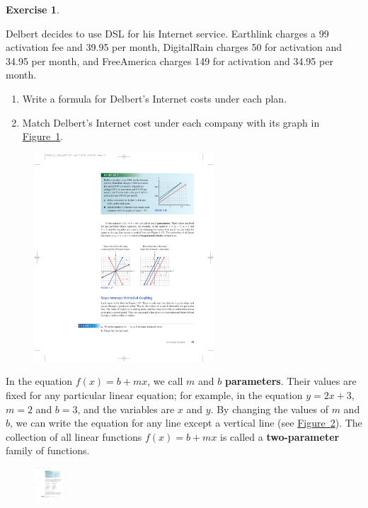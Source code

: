 \documentclass[10pt,]{book}
\newcommand{\terminology}[1]{\textbf{#1}}
\theoremstyle{plain}
\theoremstyle{definition}
\theoremstyle{definition}
\theoremstyle{definition}
\theoremstyle{definition}
\newtheorem{exercise}[theorem]{Exercise}
\numberwithin{equation}{section}
\begin{document}
\begin{exercise}\label{exercise-dsl-price}

Delbert decides to use DSL for his Internet service. Earthlink charges a \textdollar{}99 activation fee and \textdollar{}39.95 per month, DigitalRain charges \textdollar{}50 for activation and \textdollar{}34.95 per month, and FreeAmerica charges \textdollar{}149 for activation and \textdollar{}34.95 per month.
\leavevmode%
\begin{enumerate}[label=*\alph**]
\item\hypertarget{li-162}{}Write a formula for Delbert's Internet costs under each plan.
    \item\hypertarget{li-163}{}Match Delbert's Internet cost under each company with its graph in \hyperref[fig-dsl-price]{Figure~\ref{fig-dsl-price}}.
    \end{enumerate}
\leavevmode%
\begin{figure}
\centering
\includegraphics[width=0.60\textwidth,]{images/fig-dsl-price.pdf}\caption{\label{fig-dsl-price}}
\end{figure}
\end{exercise}
\par

    In the equation \(f (x) = b + mx\), we call \(m\) and \(b\) \terminology{parameters}. Their values are fixed for any particular linear equation; for example, in the equation \(y = 2x + 3\), \(m = 2\) and \(b = 3\), and the variables are \(x\) and \(y\). By changing the values of \(m\) and \(b\), we can write the equation for any line except a vertical line (see \hyperref[fig-slope-vs-intercept]{Figure~\ref{fig-slope-vs-intercept}}). The collection of all linear functions \(f (x) = b + mx\) is called a \terminology{two-parameter} family of functions.
%
\leavevmode%
\begin{figure}
\centering
\includegraphics[width=0.100\textwidth,]{images/fig-slope-vs-intercept.pdf}\caption{\label{fig-slope-vs-intercept}}
\end{figure}
\typeout{************************************************}
\typeout{************************************************}
\end{document}
